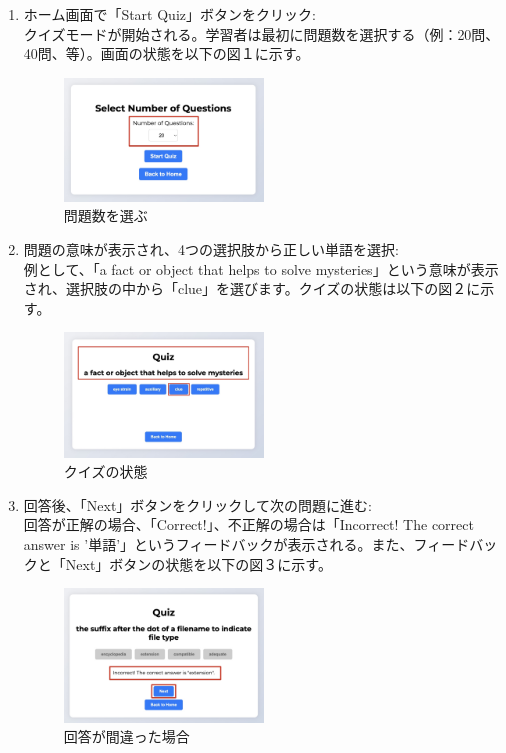 \documentclass[]{jsarticle}
\begin{document}
\begin{enumerate}
    \item ホーム画面で「Start Quiz」ボタンをクリック:\\
        クイズモードが開始される。学習者は最初に問題数を選択する（例：20問、40問、等）。画面の状態を以下の図１に示す。
        
        \begin{figure}[H]
        \centering
        \includegraphics[width=0.5\textwidth]{start-quiz.jpg}
        \caption{問題数を選ぶ}
        \end{figure}

    \item 問題の意味が表示され、4つの選択肢から正しい単語を選択:\\
        例として、「a fact or object that helps to solve mysteries」という意味が表示され、選択肢の中から「clue」を選びます。クイズの状態は以下の図２に示す。
        
        \begin{figure}[H]
        \centering
        \includegraphics[width=0.5\textwidth]{question-display.jpg}
        \caption{クイズの状態}
        \end{figure}

    \item 回答後、「Next」ボタンをクリックして次の問題に進む:\\
        回答が正解の場合、「Correct!」、不正解の場合は「Incorrect! The correct answer is '単語'」というフィードバックが表示される。また、フィードバックと「Next」ボタンの状態を以下の図３に示す。
        
        \begin{figure}[H]
        \centering
        \includegraphics[width=0.5\textwidth]{score-display.jpg}
        \caption{回答が間違った場合}
        \end{figure}


\end{enumerate}
\end{document}
